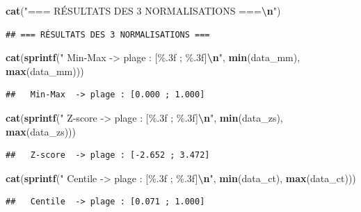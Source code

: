 \documentclass[
]{article}
\newenvironment{Shaded}{\begin{snugshade}}{\end{snugshade}}
\newcommand{\FunctionTok}[1]{\textcolor[rgb]{0.13,0.29,0.53}{\textbf{#1}}}
\newcommand{\NormalTok}[1]{#1}
\newcommand{\SpecialCharTok}[1]{\textcolor[rgb]{0.81,0.36,0.00}{\textbf{#1}}}
\newcommand{\StringTok}[1]{\textcolor[rgb]{0.31,0.60,0.02}{#1}}
\begin{document}
\begin{Shaded}
\begin{Highlighting}[]
\FunctionTok{cat}\NormalTok{(}\StringTok{"=== RÉSULTATS DES 3 NORMALISATIONS ===}\SpecialCharTok{\textbackslash{}n}\StringTok{"}\NormalTok{)}
\end{Highlighting}
\end{Shaded}

\begin{verbatim}
## === RÉSULTATS DES 3 NORMALISATIONS ===
\end{verbatim}

\begin{Shaded}
\begin{Highlighting}[]
\FunctionTok{cat}\NormalTok{(}\FunctionTok{sprintf}\NormalTok{(}\StringTok{"  Min{-}Max  {-}\textgreater{} plage : [\%.3f ; \%.3f]}\SpecialCharTok{\textbackslash{}n}\StringTok{"}\NormalTok{, }\FunctionTok{min}\NormalTok{(data\_mm), }\FunctionTok{max}\NormalTok{(data\_mm)))}
\end{Highlighting}
\end{Shaded}

\begin{verbatim}
##   Min-Max  -> plage : [0.000 ; 1.000]
\end{verbatim}

\begin{Shaded}
\begin{Highlighting}[]
\FunctionTok{cat}\NormalTok{(}\FunctionTok{sprintf}\NormalTok{(}\StringTok{"  Z{-}score  {-}\textgreater{} plage : [\%.3f ; \%.3f]}\SpecialCharTok{\textbackslash{}n}\StringTok{"}\NormalTok{, }\FunctionTok{min}\NormalTok{(data\_zs), }\FunctionTok{max}\NormalTok{(data\_zs)))}
\end{Highlighting}
\end{Shaded}

\begin{verbatim}
##   Z-score  -> plage : [-2.652 ; 3.472]
\end{verbatim}

\begin{Shaded}
\begin{Highlighting}[]
\FunctionTok{cat}\NormalTok{(}\FunctionTok{sprintf}\NormalTok{(}\StringTok{"  Centile  {-}\textgreater{} plage : [\%.3f ; \%.3f]}\SpecialCharTok{\textbackslash{}n}\StringTok{"}\NormalTok{, }\FunctionTok{min}\NormalTok{(data\_ct), }\FunctionTok{max}\NormalTok{(data\_ct)))}
\end{Highlighting}
\end{Shaded}

\begin{verbatim}
##   Centile  -> plage : [0.071 ; 1.000]
\end{verbatim}
\end{document}
